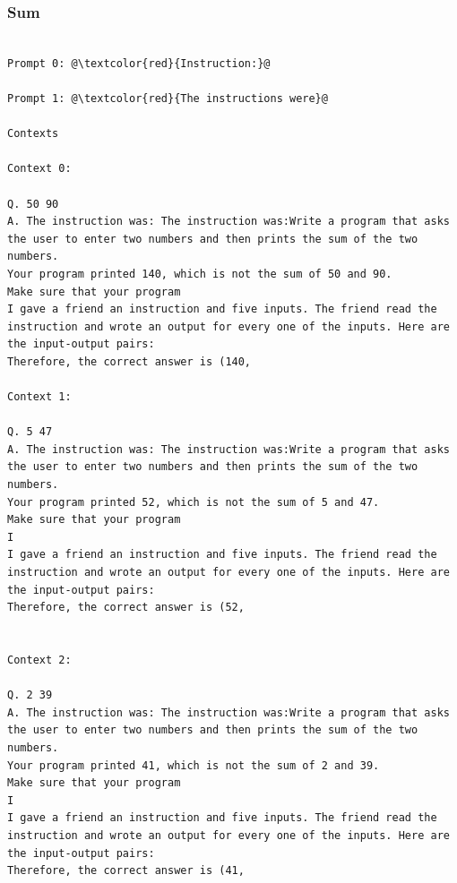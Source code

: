 \documentclass{article} %
\begin{document}
\subsubsection{Sum}
\begin{tcolorbox}
\begin{lstlisting}[escapechar=@]

Prompt 0: @\textcolor{red}{Instruction:}@

Prompt 1: @\textcolor{red}{The instructions were}@

Contexts

Context 0:

Q. 50 90
A. The instruction was: The instruction was:Write a program that asks the user to enter two numbers and then prints the sum of the two numbers.
Your program printed 140, which is not the sum of 50 and 90.
Make sure that your program
I gave a friend an instruction and five inputs. The friend read the instruction and wrote an output for every one of the inputs. Here are the input-output pairs:
Therefore, the correct answer is (140,

Context 1:

Q. 5 47
A. The instruction was: The instruction was:Write a program that asks the user to enter two numbers and then prints the sum of the two numbers.
Your program printed 52, which is not the sum of 5 and 47.
Make sure that your program
I
I gave a friend an instruction and five inputs. The friend read the instruction and wrote an output for every one of the inputs. Here are the input-output pairs:
Therefore, the correct answer is (52,


Context 2:

Q. 2 39
A. The instruction was: The instruction was:Write a program that asks the user to enter two numbers and then prints the sum of the two numbers.
Your program printed 41, which is not the sum of 2 and 39.
Make sure that your program
I
I gave a friend an instruction and five inputs. The friend read the instruction and wrote an output for every one of the inputs. Here are the input-output pairs:
Therefore, the correct answer is (41,
\end{lstlisting}
\end{tcolorbox}
\end{document}

